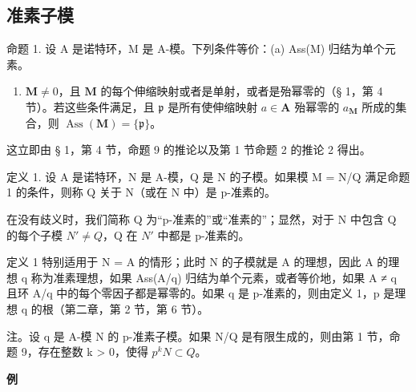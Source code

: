 \subsection{准素子模}

命题 1. 设 A 是诺特环，M 是 A-模。下列条件等价：(a) Ass(M) 归结为单个元素。

\begin{enumerate}
\def\labelenumi{(\alph{enumi})}
\setcounter{enumi}{1}
\tightlist
\item
  \(\mathbf{M} \neq 0\)，且 \(\mathbf{M}\) 的每个伸缩映射或者是单射，或者是殆幂零的（§ 1，第 4 节）。若这些条件满足，且 \(\mathfrak{p}\) 是所有使伸缩映射 \(a \in \mathbf{A}\) 殆幂零的 \(a_{\mathbf{M}}\) 所成的集合，则 \(\operatorname{Ass}(\mathbf{M}) = \{\mathfrak{p}\}\)。
\end{enumerate}

这立即由 § 1，第 4 节，命题 9 的推论以及第 1 节命题 2 的推论 2 得出。

定义 1. 设 A 是诺特环，N 是 A-模，Q 是 N 的子模。如果模 M = N/Q 满足命题 1 的条件，则称 Q 关于 N（或在 N 中）是 p-准素的。

在没有歧义时，我们简称 Q 为“p-准素的”或“准素的”；显然，对于 N 中包含 Q 的每个子模 \(N' \neq Q\)，Q 在 \(N'\) 中都是 p-准素的。

定义 1 特别适用于 N = A 的情形；此时 N 的子模就是 A 的理想，因此 A 的理想 q 称为准素理想，如果 Ass(A/q) 归结为单个元素，或者等价地，如果 A ≠ q 且环 A/q 中的每个零因子都是幂零的。如果 q 是 p-准素的，则由定义 1，p 是理想 q 的根（第二章，第 2 节，第 6 节）。

注。设 q 是 A-模 N 的 p-准素子模。如果 N/Q 是有限生成的，则由第 1 节，命题 9，存在整数 k \textgreater{} 0，使得 \(p^{k}N \subset Q\)。

\textbf{例}\par


